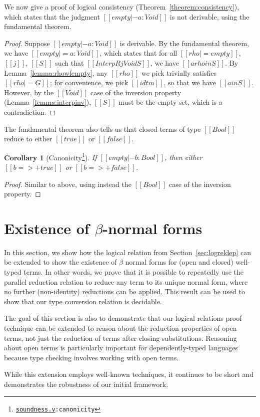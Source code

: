 \documentclass[\ifpublic nolinenum\else\fi,online,OA]{jfp}
\newcommand{\scw}[1]{}
\newcommand{\yl}[1]{}
\newcommand{\dotv}[2]{\href{#1}{\texttt{#1}}{\texttt{:#2}}}
\newtheorem{corollary}[theorem]{Corollary}
\theoremstyle{definition}
\begin{document}
We now give a proof of logical consistency (Theorem~\ref{theorem:consistency}),
which states that the judgment $[[empty |- a : Void]]$ is not derivable,
using the fundamental theorem.

\begin{proof}
  Suppose $[[empty |- a : Void]]$ is derivable. By the
  fundamental theorem, we have $[[empty |= a : Void]]$, which states
  that for all $[[rho |= empty]]$, $[[j]]$, $[[S]]$ such
  that $[[InterpR j Void S]]$, we have $[[a {rho} in S]]$.
  By Lemma~\ref{lemma:rhowfempty}, any $[[rho]]$ we pick trivially
  satisfies $[[rho |= G]]$; for convenience, we pick $[[idtm]]$,
  so that we have $[[a in S]]$.
  However, by the $[[Void]]$ case of the inversion property
  (Lemma~\ref{lemma:interpinv}), $[[S]]$ must be the empty set,
  which is a contradiction.
\end{proof}

The fundamental theorem also tells us that closed terms of type 
$[[Bool]]$ reduce to either $[[true]]$ or $[[false]]$.

\begin{corollary}[Canonicity\footnote{\dotv{soundness.v}{canonicity}}]
If $[[empty |- b : Bool]]$, then either $[[b =>+ true]]$ or $[[b =>+ false]]$.
\end{corollary}
\begin{proof}
  Similar to above, using instead the $[[Bool]]$ case of the inversion property.
\end{proof}

\section{Existence of \texorpdfstring{$\beta$}{beta}-normal forms}
\label{sec:extension}
In this section, we show how the logical relation from
Section~\ref{sec:logreldep} can be extended to show the existence of $\beta$
normal forms for (open and closed) well-typed terms.  In other words, we prove
that it is possible to repeatedly use the parallel reduction relation to
reduce any term to its unique normal form, where no further (non-identity)
reductions can be applied. This result can be used to show that our type
conversion relation is decidable.%

The goal of this section is also to demonstrate that our logical relations
proof technique can be extended to reason about the reduction properties of
open terms, not just the reduction of terms after closing substitutions.
Reasoning about open terms is particularly important for dependently-typed
languages because type checking involves working with open terms.
\scw{
  Add when we can find a reference:
  However, even non dependently-typed languages employ such techniques,
  especially in the case of relational semantics.
}
While this extension employs well-known techniques, it continues to be short and
demonstrates the robustness of our initial framework.
\end{document}
